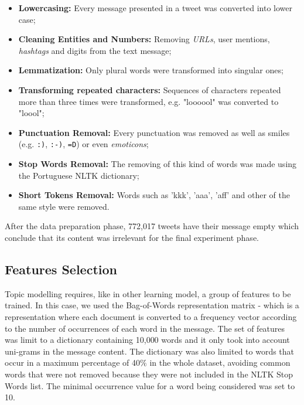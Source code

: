 \begin{itemize}
\item \textbf{Lowercasing:} Every message presented in a tweet was converted into lower case;
\item \textbf{Cleaning Entities and Numbers:} Removing \textit{URLs}, user mentions, \textit{hashtags} and digits from the text message;
\item \textbf{Lemmatization:} Only plural words were transformed into singular ones;
\item \textbf{Transforming repeated characters:} Sequences of characters repeated more than three times were transformed, e.g. "loooool" was converted to "loool";
\item \textbf{Punctuation Removal:} Every punctuation was removed as well as smiles (e.g. \texttt{:)}, \texttt{:-)}, \texttt{=D}) or even \emph{emoticons};
\item \textbf{Stop Words Removal:} The removing of this kind of words was made using the Portuguese NLTK dictionary;
\item \textbf{Short Tokens Removal:} Words such as 'kkk', 'aaa', 'aff' and other of the same style were removed.
\end{itemize}

After the data preparation phase, 772,017 tweets have their message empty which conclude that its content was irrelevant for the final experiment phase.

\subsection{Features Selection}
Topic modelling requires, like in other learning model, a group of features to be trained. In this case, we used the Bag-of-Words representation matrix - which is a representation where each document is converted to a frequency vector according to the number of occurrences of each word in the message. The set of features was limit to a dictionary containing 10,000 words and it only took into account uni-grams in the message content. The dictionary was also limited to words that occur in a maximum percentage of 40$\%$ in the whole dataset, avoiding common words that were not removed because they were not included in the NLTK Stop Words list. The minimal occurrence value for a word being considered was set to 10.

